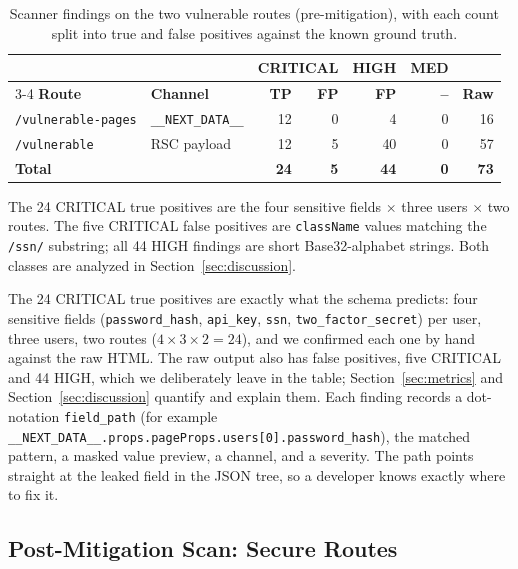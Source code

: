 \documentclass[runningheads]{llncs}
\begin{document}
\begin{table}[tbp]
  \caption{Scanner findings on the two vulnerable routes (pre-mitigation),
    with each count split into true and false positives against the
    known ground truth.}
  \label{tab:results_vuln}
  \centering
  \begin{tabular}{llrrrrr}
    \toprule
    & & \multicolumn{2}{c}{\textbf{CRITICAL}} & \textbf{HIGH} & \textbf{MED} & \\
    \cmidrule(lr){3-4}
    \textbf{Route} & \textbf{Channel} & \textbf{TP} & \textbf{FP} & \textbf{FP} & \textbf{--} & \textbf{Raw} \\
    \midrule
    \texttt{/vulnerable-pages} & \texttt{\_\_NEXT\_DATA\_\_} & 12 & 0  & 4  & 0 & 16 \\
    \texttt{/vulnerable}       & RSC payload                  & 12 & 5  & 40 & 0 & 57 \\
    \midrule
    \textbf{Total}             &                              & \textbf{24} & \textbf{5} & \textbf{44} & \textbf{0} & \textbf{73} \\
    \bottomrule
  \end{tabular}

  \smallskip
  \footnotesize{The 24 CRITICAL true positives are the four sensitive
    fields \(\times\) three users \(\times\) two routes.  The five
    CRITICAL false positives are \texttt{className} values matching the
    \texttt{/ssn/} substring; all 44 HIGH findings are short Base32-alphabet
    strings.  Both classes are analyzed in Section~\ref{sec:discussion}.}
\end{table}

The 24 CRITICAL true positives are exactly what the schema predicts: four
sensitive fields (\texttt{password\_hash}, \texttt{api\_key},
\texttt{ssn}, \texttt{two\_factor\_secret}) per user, three users, two
routes ($4 \times 3 \times 2 = 24$), and we confirmed each one by hand
against the raw HTML.  The raw output also has false positives, five
CRITICAL and 44 HIGH, which we deliberately leave in the table;
Section~\ref{sec:metrics} and Section~\ref{sec:discussion} quantify and
explain them.  Each finding records a dot-notation \texttt{field\_path}
(for example
\texttt{\_\_NEXT\_DATA\_\_.props.pageProps.users[0].password\_hash}), the
matched pattern, a masked value preview, a channel, and a severity.  The
path points straight at the leaked field in the JSON tree, so a developer
knows exactly where to fix it.

\subsection{Post-Mitigation Scan: Secure Routes}
\end{document}
